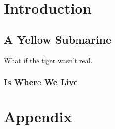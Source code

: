 \documentclass[arial, double]{wvuthesis}
\begin{document}

\chapter{Introduction}
\lipsum[3-6]
\section{A Yellow Submarine}
\lipsum[12-20]

What if the tiger wasn't real. \cite{Liounis:2016}
\subsection{Is Where We Live}
\lipsum[1]




\chapter*{Appendix}
\lipsum[17-23]
\end{document}
